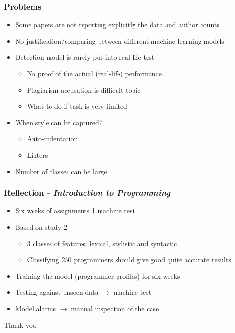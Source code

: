\documentclass[t,12pt,pdftex]{beamer}
\begin{document}
\begin{frame}
	\frametitle{Problems}
	\begin{itemize}
		\item Some papers are not reporting explicitly the data and author counts
		\item No justification/comparing between different machine learning models
		\item Detection model is rarely put into real life test
		\begin{itemize}
			\item No proof of the actual (real-life) performance
			\item Plagiarism accusation is difficult topic
			\item What to do if task is very limited
		\end{itemize}
		\item When style can be captured?
		\begin{itemize}
			\item Auto-indentation
			\item Linters
		\end{itemize}
		\item Number of classes can be large
	\end{itemize}
\end{frame}

\begin{frame}
	\frametitle{Reflection - \textit{Introduction to Programming}}
	\begin{itemize}
		\item Six weeks of assignments 1 machine test		
		\item Based on study 2
		\begin{itemize}
			\item 3 classes of features: lexical, stylistic and syntactic
			\item Classifying 250 programmers should give good quite accurate results	
		\end{itemize}
		\item Training the model (programmer profiles) for six weeks
		\item Testing against unseen data $\rightarrow$ machine test	 		\item Model alarms $\rightarrow$ manual inspection of the case
	\end{itemize}
\end{frame}

\begin{frame}
	\vspace{1.5in}
	Thank you
\end{frame}
\end{document}

